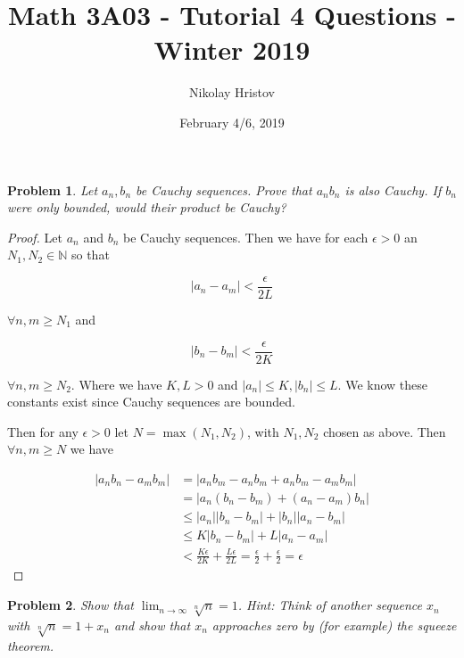 \documentclass[11pt]{article}
\theoremstyle{plain}
\newtheorem{problem}{Problem}
\theoremstyle{remark}
\begin{document}
	\title{Math 3A03 - Tutorial 4 Questions - Winter 2019}
	\author{Nikolay Hristov}
	\date{February 4/6, 2019}
	\maketitle
	
	\begin{problem}
		Let $a_n,b_n$ be Cauchy sequences. Prove that $a_nb_n$ is also Cauchy. If $b_n$ were only bounded, would their product be Cauchy?
	\end{problem}

		\begin{proof}
		Let $a_n$ and $b_n$ be Cauchy sequences. Then we have for each $\epsilon>0$ an $N_1,N_2\in \mathbb N$ so that
		
		\[
		|a_n-a_m|<\frac {\epsilon }{2L} 
		\]
		
		$\forall n,m\geq N_1$ and
		
		\[
		|b_n-b_m|<\frac{\epsilon}{2K}
		\]
		
		$\forall n,m\geq N_2$. Where we have $K,L>0$ and $|a_n|\leq K, |b_n|\leq L$. We know these constants exist since Cauchy sequences are bounded.
		
		Then for any $\epsilon>0$ let $N=\max(N_1,N_2)$, with $N_1, N_2$ chosen as above. Then $\forall n,m\geq N$ we have
		
		\begin{align*}
		|a_nb_n-a_mb_m|&=|a_nb_m - a_nb_m +a_nb_m-a_mb_m|\\
		&=|a_n(b_n-b_m)+(a_n-a_m)b_n|\\
		&\leq  |a_n||b_n-b_m| + |b_n||a_n-b_m|\tag{By Triangle ineqaulity}\\
		&\leq K|b_n-b_m|+L|a_n-a_m| \tag{by boundedness}\\
		&<\frac{K\epsilon}{2K}+\frac{L\epsilon}{2L}=\frac \epsilon 2 + \frac \epsilon 2 =\epsilon 
		\end{align*}
	\end{proof}
	


	\begin{problem}
		Show that $\displaystyle{\lim_{n \to \infty}} \sqrt[n]{n} = 1$. Hint: Think of another sequence $x_n$ with $ \sqrt[n]{n}=1+x_n$ and show that $x_n$ approaches zero by (for example) the squeeze theorem.
	\end{problem}
\end{document}
